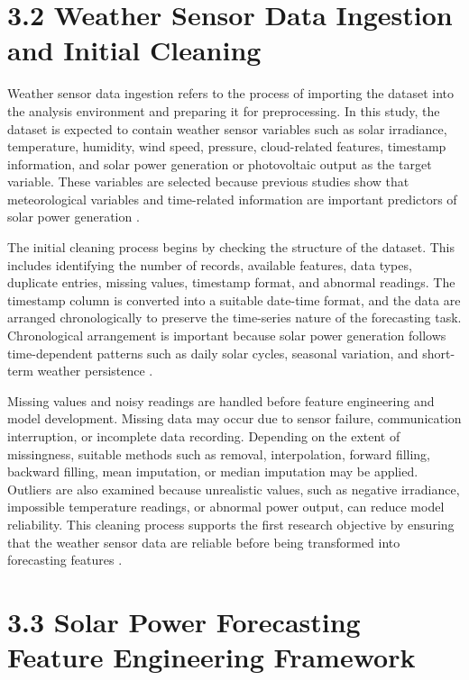 \section{3.2 Weather Sensor Data Ingestion and Initial Cleaning}

Weather sensor data ingestion refers to the process of importing the dataset into the analysis environment and preparing it for preprocessing. In this study, the dataset is expected to contain weather sensor variables such as solar irradiance, temperature, humidity, wind speed, pressure, cloud-related features, timestamp information, and solar power generation or photovoltaic output as the target variable. These variables are selected because previous studies show that meteorological variables and time-related information are important predictors of solar power generation \parencite{CarvalhoJunior2025, TsaiLo2025, Alhassan2025}.

The initial cleaning process begins by checking the structure of the dataset. This includes identifying the number of records, available features, data types, duplicate entries, missing values, timestamp format, and abnormal readings. The timestamp column is converted into a suitable date-time format, and the data are arranged chronologically to preserve the time-series nature of the forecasting task. Chronological arrangement is important because solar power generation follows time-dependent patterns such as daily solar cycles, seasonal variation, and short-term weather persistence \parencite{Eren2025, TsaiLo2025, Duvuru2026}.

Missing values and noisy readings are handled before feature engineering and model development. Missing data may occur due to sensor failure, communication interruption, or incomplete data recording. Depending on the extent of missingness, suitable methods such as removal, interpolation, forward filling, backward filling, mean imputation, or median imputation may be applied. Outliers are also examined because unrealistic values, such as negative irradiance, impossible temperature readings, or abnormal power output, can reduce model reliability. This cleaning process supports the first research objective by ensuring that the weather sensor data are reliable before being transformed into forecasting features \parencite{JnanaVarshitha2025, Pongphaw2025, Duvuru2026}.

\section{3.3 Solar Power Forecasting Feature Engineering Framework}

